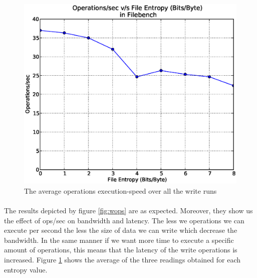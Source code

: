 \begin{figure}[H]
\begin{center}
\includegraphics[scale=.55]{../results/set1/write_ops_avg.eps}
\caption{The average operations execution-speed over all the write runs}
\label{fig:wopsavg}
\end{center}
\end{figure}

\paragraph{}
The results depicted by figure \ref{fig:wops} are as expected. Moreover, they show us the effect of ops/sec on bandwidth and latency. The less we operations we can execute per second the less the size of data we can write which decrease the bandwidth.
 In the same manner if we want more time to execute a specific amount of operations, this means that the latency of the write operations is increased. Figure \ref{fig:wopsavg} shows the average of the three readings obtained for each entropy value.

